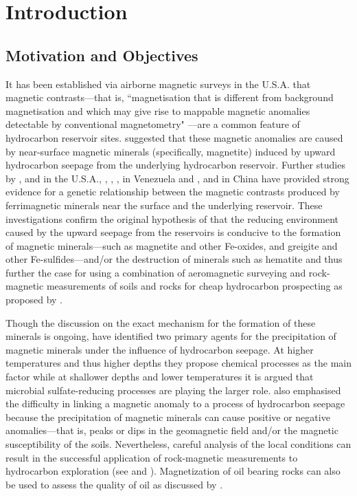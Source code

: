 
\chapter{Introduction}

\section{Motivation and Objectives}

It has been established via airborne magnetic surveys in the U.S.A. \citep{Donovan} that magnetic contrasts---that is, ``magnetisation that is different from background magnetisation and which may give rise to mappable magnetic anomalies detectable by conventional magnetometry" \citep{Machel}---are a common feature of hydrocarbon reservoir sites. \citet{Donovan} suggested that these magnetic anomalies are caused by near-surface magnetic minerals (specifically, magnetite) induced by upward hydrocarbon seepage from the underlying hydrocarbon reservoir. Further studies by \citet{Donovan2}, \citet{Reynolds} and \citet{Elmore} in the U.S.A., \citet{Diaz}, \citet{Costanzo}, \citet{Guzman}, \citet{Gonzalez} in Venezuela and \citet{Liu3}, \citet{Liu2} and \citet{Liu} in China have provided strong evidence for a genetic relationship between the magnetic contrasts produced by ferrimagnetic minerals near the surface and the underlying reservoir. These investigations confirm the original hypothesis of \citet{Donovan} that the reducing environment caused by the upward seepage from the reservoirs is conducive to the formation of magnetic minerals---such as magnetite and other Fe-oxides, and greigite and other Fe-sulfides---and/or the destruction of minerals such as hematite \citep{Machel} and thus further the case for using a combination of aeromagnetic surveying and rock-magnetic measurements of soils and rocks for cheap hydrocarbon prospecting as proposed by \citet{Donovan2}.\par

Though the discussion on the exact mechanism for the formation of these minerals is ongoing, \citet{Machel} have identified two primary agents for the precipitation of magnetic minerals under the influence of hydrocarbon seepage. At higher temperatures and thus higher depths they propose chemical processes as the main factor while at shallower depths and lower temperatures it is argued that microbial sulfate-reducing processes are playing the larger role. \citet{Machel} also emphasised the difficulty in linking a magnetic anomaly to a process of hydrocarbon seepage because the precipitation of magnetic minerals can cause positive or negative anomalies---that is, peaks or dips in the geomagnetic field and/or the magnetic susceptibility of the soils. Nevertheless, careful analysis of the local conditions can result in the successful application of rock-magnetic measurements to hydrocarbon exploration (see \citet{Liu} and \citet{Donovan2}). Magnetization of oil bearing rocks can also be used to assess the quality of oil as discussed by \citet{Emmerton}.\par

